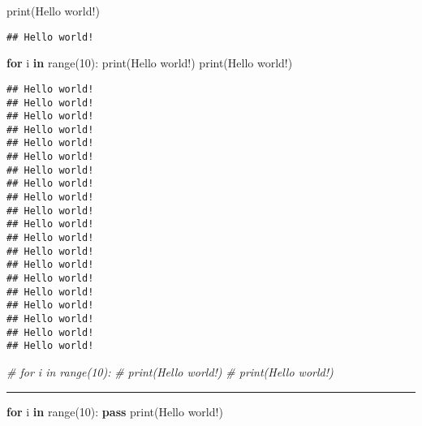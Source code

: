 \documentclass[
]{book}
\newenvironment{Shaded}{\begin{snugshade}}{\end{snugshade}}
\newcommand{\BuiltInTok}[1]{#1}
\newcommand{\CommentTok}[1]{\textcolor[rgb]{0.56,0.35,0.01}{\textit{#1}}}
\newcommand{\ControlFlowTok}[1]{\textcolor[rgb]{0.13,0.29,0.53}{\textbf{#1}}}
\newcommand{\DecValTok}[1]{\textcolor[rgb]{0.00,0.00,0.81}{#1}}
\newcommand{\KeywordTok}[1]{\textcolor[rgb]{0.13,0.29,0.53}{\textbf{#1}}}
\newcommand{\NormalTok}[1]{#1}
\newcommand{\StringTok}[1]{\textcolor[rgb]{0.31,0.60,0.02}{#1}}
\begin{document}
\begin{Shaded}
\begin{Highlighting}[]
\BuiltInTok{print}\NormalTok{(}\StringTok{\textquotesingle{}Hello world!\textquotesingle{}}\NormalTok{)}
\end{Highlighting}
\end{Shaded}

\begin{verbatim}
## Hello world!
\end{verbatim}

\begin{Shaded}
\begin{Highlighting}[]
\ControlFlowTok{for}\NormalTok{ i }\KeywordTok{in} \BuiltInTok{range}\NormalTok{(}\DecValTok{10}\NormalTok{):}
    \BuiltInTok{print}\NormalTok{(}\StringTok{\textquotesingle{}Hello world!\textquotesingle{}}\NormalTok{)}
    \BuiltInTok{print}\NormalTok{(}\StringTok{\textquotesingle{}Hello world!\textquotesingle{}}\NormalTok{)}
\end{Highlighting}
\end{Shaded}

\begin{verbatim}
## Hello world!
## Hello world!
## Hello world!
## Hello world!
## Hello world!
## Hello world!
## Hello world!
## Hello world!
## Hello world!
## Hello world!
## Hello world!
## Hello world!
## Hello world!
## Hello world!
## Hello world!
## Hello world!
## Hello world!
## Hello world!
## Hello world!
## Hello world!
\end{verbatim}

\begin{Shaded}
\begin{Highlighting}[]
\CommentTok{\# for i in range(10):}
\CommentTok{\# print(\textquotesingle{}Hello world!\textquotesingle{})}
\CommentTok{\# print(\textquotesingle{}Hello world!\textquotesingle{})}
\end{Highlighting}
\end{Shaded}

\begin{center}\rule{0.5\linewidth}{0.5pt}\end{center}

\begin{Shaded}
\begin{Highlighting}[]
\ControlFlowTok{for}\NormalTok{ i }\KeywordTok{in} \BuiltInTok{range}\NormalTok{(}\DecValTok{10}\NormalTok{):}
    \ControlFlowTok{pass}
\BuiltInTok{print}\NormalTok{(}\StringTok{\textquotesingle{}Hello world!\textquotesingle{}}\NormalTok{)}
\end{Highlighting}
\end{Shaded}
\end{document}
